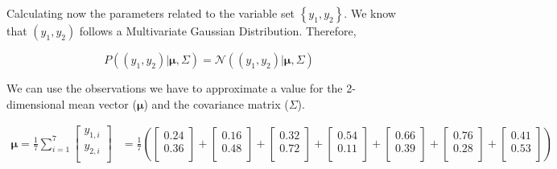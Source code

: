 \documentclass[12pt]{article}
\begin{document}
\begin{enumerate}[leftmargin=\labelsep]
\begin{enumerate}
                Calculating now the parameters related to the variable set $\left\{y_1, y_2\right\}$. We know that $(y_1, y_2)$ follows a Multivariate Gaussian Distribution.
                Therefore,

                \begin{equation}\label{ex1-normal}
                  P\left((y_1, y_2) | \boldsymbol{\mu}, \Sigma\right)
                  = \mathcal{N}\left((y_1, y_2) | \boldsymbol{\mu}, \Sigma\right)
                \end{equation}

                We can use the observations we have to approximate a value for the
                2-dimensional mean vector ($\boldsymbol{\mu}$) and the covariance matrix ($\Sigma$).

                $$
                  \begin{aligned}
                    \boldsymbol{\mu} = \frac{1}{7} \sum^{7}_{i=1} \begin{bmatrix}y_{1,i} \\y_{2,i} \\\end{bmatrix} & =
                    \frac{1}{7}
                    \left(\begin{bmatrix}0.24 \\0.36 \\\end{bmatrix} +
                    \begin{bmatrix}0.16 \\0.48 \\\end{bmatrix} +
                    \begin{bmatrix}0.32 \\0.72 \\\end{bmatrix} +
                    \begin{bmatrix}0.54 \\0.11 \\\end{bmatrix} +
                    \begin{bmatrix}0.66 \\0.39 \\\end{bmatrix} +
                    \begin{bmatrix}0.76 \\0.28 \\\end{bmatrix} +
                    \begin{bmatrix}0.41 \\0.53 \\\end{bmatrix}\right)                                                                                               \\

\end{aligned}$$
\end{enumerate}
\end{enumerate}
\end{document}
